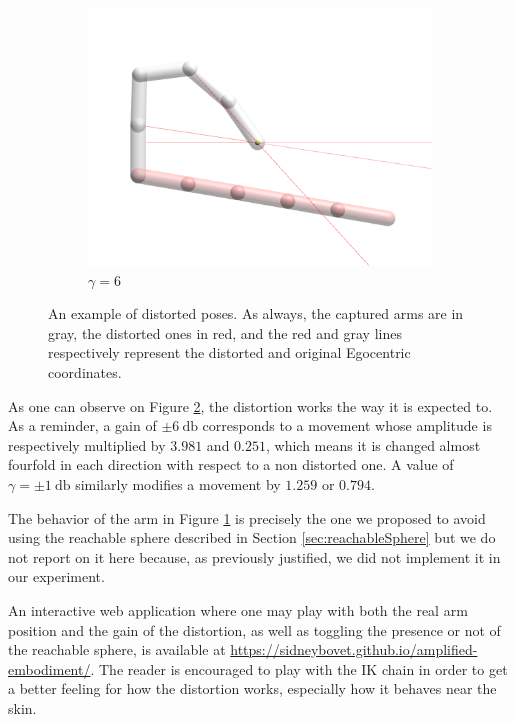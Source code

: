 \begin{figure}[h]
\begin{subfigure}[b]{.3\textwidth}
        \includegraphics[width=\textwidth]{Figures/distortions/distortions6.png}
        \caption{$\gamma = 6$}
        \label{subfig:gamma6}
    \end{subfigure}
        
    \caption{An example of distorted poses. As always, the captured arms are in gray, the distorted ones in red, and the red and gray lines respectively represent the distorted and original Egocentric coordinates.}
    \label{fig:distortionExamples}
\end{figure}

As one can observe on Figure \ref{fig:distortionExamples}, the distortion works the way it is expected to. As a reminder, a gain of $\pm\SI{6}{\decibel}$ corresponds to a movement whose amplitude is respectively multiplied by $3.981$ and $0.251$, which means it is changed almost fourfold in each direction with respect to a non distorted one. A value of $\gamma = \pm\SI{1}{\decibel}$ similarly modifies a movement by $1.259$ or $0.794$.

The behavior of the arm in Figure \ref{subfig:gamma6} is precisely the one we proposed to avoid using the reachable sphere described in Section \ref{sec:reachableSphere} but we do not report on it here because, as previously justified, we did not implement it in our experiment.

An interactive web application where one may play with both the real arm position and the gain of the distortion, as well as toggling the presence or not of the reachable sphere, is available at \url{https://sidneybovet.github.io/amplified-embodiment/}. The reader is encouraged to play with the IK chain in order to get a better feeling for how the distortion works, especially how it behaves near the skin.

